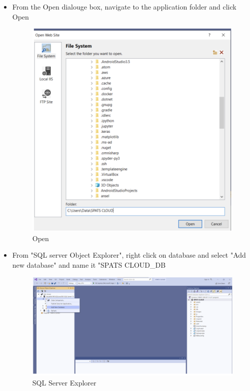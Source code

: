\documentclass[10pt]{article}
\begin{document}
\begin{itemize}
\item From the Open dialouge box, navigate to the application folder and click Open
\begin{figure}[H]
    \begin{center}
        \includegraphics[width=0.7\linewidth, frame]{CA2-template/CM11.png}
       \caption{Open \label{fig:3}}
    \end{center}
\end{figure}

\item From "SQL server Object Explorer", right click on database and select "Add new database" and name it "SPATS CLOUD\_DB 
\begin{figure}[H]
    \begin{center}
        \includegraphics[width=0.7\linewidth, frame]{CA2-template/CM12.png}
       \caption{SQL Server Explorer \label{fig:4}}
    \end{center}
\end{figure}


\end{itemize}
\end{document}
